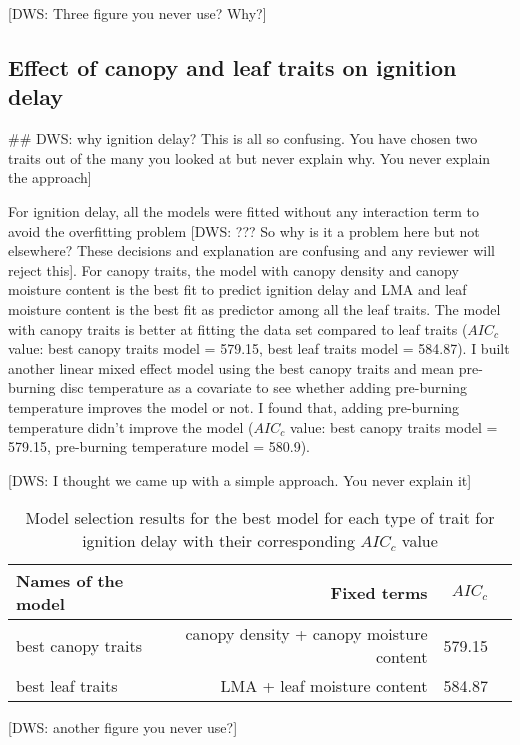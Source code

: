 \documentclass[12pt]{report}
\begin{document}
[DWS: Three figure you never use? Why?]



\subsection{Effect of canopy and leaf traits on ignition delay}

## DWS: why ignition delay? This is all so confusing. You have chosen two
traits out of the many you looked at but never explain why. You never explain
the approach]

For ignition delay, all the models were fitted without any interaction term to avoid the overfitting problem [DWS:  ??? So why is it a problem here but not elsewhere? These decisions and explanation are confusing and any reviewer will reject this]. For canopy traits, the model with canopy density and canopy moisture content is the best fit to predict ignition delay and LMA and leaf moisture content is the best fit as predictor among all the leaf traits. The model with canopy traits is better at fitting the data set compared to leaf traits ($AIC_{c}$ value: best canopy traits model = 579.15, best leaf traits model = 584.87). I built another linear mixed effect model using the best canopy traits and  mean pre-burning disc temperature as a covariate to see whether adding pre-burning temperature improves the model or not. I found that, adding pre-burning temperature didn't improve the model ($AIC_{c}$ value: best canopy traits model = 579.15, pre-burning temperature model = 580.9).

[DWS: I thought we came up with a simple approach. You never explain it]

\begin{table}
\centering
\begin{tabular}{lrrr}
       \hline
       \textbf{ Names of the model} & \textbf{Fixed terms} & \textbf{$AIC_{c}$} \\
       \hline
        best canopy traits  & canopy density +  canopy moisture content &  579.15 \\
       \hline
        best leaf traits    & LMA +  leaf moisture content &  584.87 \\
       \hline
\end{tabular}
\caption{Model selection results for the best model for each type of trait for ignition delay with their corresponding $AIC_{c}$ value}
\end{table}

[DWS: another figure you never use?]
\end{document}

